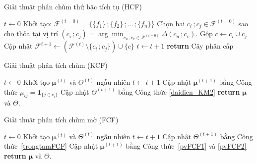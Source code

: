 \documentclass[a4paper,oneside]{book} %
\theoremstyle{plain}
\theoremstyle{plain}
\theoremstyle{nonumberplain}
\begin{document}
\begin{spacing}{1.0}
\begin{algorithm}
	\fontsize{11pt}{14pt}\selectfont
	\caption{Giải thuật phân chùm thứ bậc tích tụ (HCF)}\label{alg:HCF}
	\begin{algorithmic}[1]
		\State $t \gets 0$
		\State Khởi tạo: $\mathcal{F}^{(t=0)} = \{\{f_1\}\,;\{f_2\}\,;\ldots\,;\{f_n\}\}$
		\State Chọn hai $c_i\,; c_j \in \mathcal{F}^{(t=0)}$ sao cho thỏa tại vị trí $(c_i\,;c_j)=\arg\min_{c_u\,;c_v\in\mathcal{F}^{(t=0)}}\Delta(c_u\,;c_v).$
		\State Gộp $c \gets c_i \cup c_j$
		\State Cập nhật $\mathcal{F}^{t+1}\gets \left(\mathcal{F}^{(t)}\setminus\{c_i\,;c_j\}\right)\cup\{c\}$
		\State $t \gets t + 1$
		\EndWhile
		\State \textbf{return} Cây phân cấp
		\EndProcedure
	\end{algorithmic}
\end{algorithm}



\begin{algorithm}[H]
	\fontsize{11pt}{14pt}\selectfont
	\caption{Giải thuật phân tích chùm (KCF)}
	\label{alg:KCF}
	\begin{algorithmic}[1] %
		\State $t\gets0$
		\State Khởi tạo ${\bm\mu}^{(t)}$ và $\Theta^{(t)}$ ngẫu nhiên
		\State $t \gets t+1$
		\State Cập nhật ${\bm\mu}^{(t+1)}$ bằng Công thức  $\mu_{ij}= \bm 1_{\{j\in c_i\}}$
		\State Cập nhật $\Theta^{(t+1)}$ bằng Công thức \eqref{daidien_KM2}
		\EndWhile
		\State \textbf{return} ${\bm\mu}$ và $\Theta$.
		\EndProcedure
	\end{algorithmic}
\end{algorithm}



\begin{algorithm}[H]
	\fontsize{11pt}{14pt}\selectfont
	\caption{Giải thuật phân tích chùm mờ (FCF)}
	\label{alg:FCF}
	\begin{algorithmic}[1] %
		\State $t\gets0$
		\State Khởi tạo ${\bm\mu}^{(t)}$ và $\Theta^{(t)}$ ngẫu nhiên
		\State $t \gets t+1$
		\State Cập nhật $\Theta^{(t+1)}$ bằng Công thức~\eqref{trongtamFCF}
		\State Cập nhật ${\bm\mu}^{(t+1)}$ bằng Công thức~\eqref{pvFCF1} và \eqref{pvFCF2}
		\EndWhile\label{euclidendwhile}
		\State \textbf{return} ${\bm\mu}$ và $\Theta$.
		\EndProcedure
	\end{algorithmic}
\end{algorithm}








\end{spacing}
\end{document}
